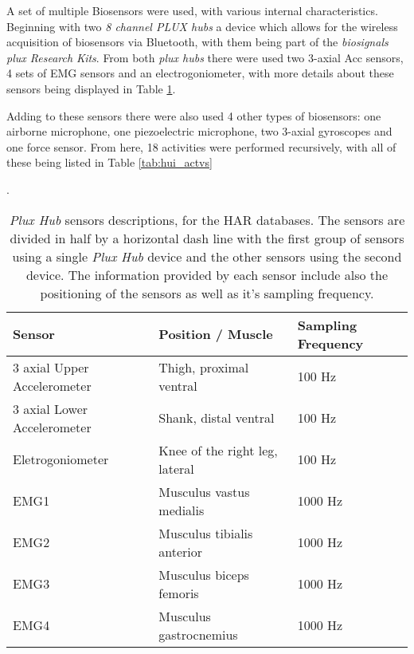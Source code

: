 A set of multiple Biosensors were used, with various internal characteristics. Beginning with two \textit{8 channel PLUX hubs} a device which allows for the wireless acquisition of biosensors via Bluetooth, with them being part of the \textit{biosignals plux Research Kits}. From both \textit{plux hubs} there were used two 3-axial \gls{Acc} sensors, 4 sets of \gls{EMG} sensors and an electrogoniometer, with more details about these sensors being displayed in Table \ref{tab:plux_hubs}.

Adding to these sensors there were also used 4 other types of biosensors: one airborne microphone, one piezoelectric microphone, two 3-axial gyroscopes and one force sensor. From here, 18 activities were performed recursively, with all of these being listed in Table \ref{tab:hui_actvs}


\begin{table}[ht]
	\caption[\textit{Plux Hub} sensors descriptions, for the \gls{HAR} database]{\textit{Plux Hub} sensors descriptions, for the \gls{HAR} databases\cite{Liu2019}. The sensors are divided in half by a horizontal dash line with the first group of sensors using a single \textit{Plux Hub} device and the other sensors using the second device. The information provided by each sensor include also the positioning of the sensors as well as it's sampling frequency.}.
	\label{tab:plux_hubs}
\centering
\begin{tabular}{lll}
	\toprule
	\textbf{Sensor} & 
	\textbf{Position / Muscle} &
	\textbf{Sampling Frequency}\\
    \midrule
3 axial Upper Accelerometer & Thigh, proximal ventral & 100 Hz \\
3 axial Lower Accelerometer & Shank, distal ventral & 100 Hz \\
Eletrogoniometer & Knee of the right leg, lateral & 100 Hz \\ \hdashline
EMG1 & Musculus vastus medialis & 1000 Hz \\
EMG2 & Musculus tibialis anterior & 1000 Hz \\
EMG3 & Musculus biceps femoris & 1000 Hz \\
EMG4 & Musculus gastrocnemius & 1000 Hz \\
\bottomrule
\end{tabular}
\end{table}

